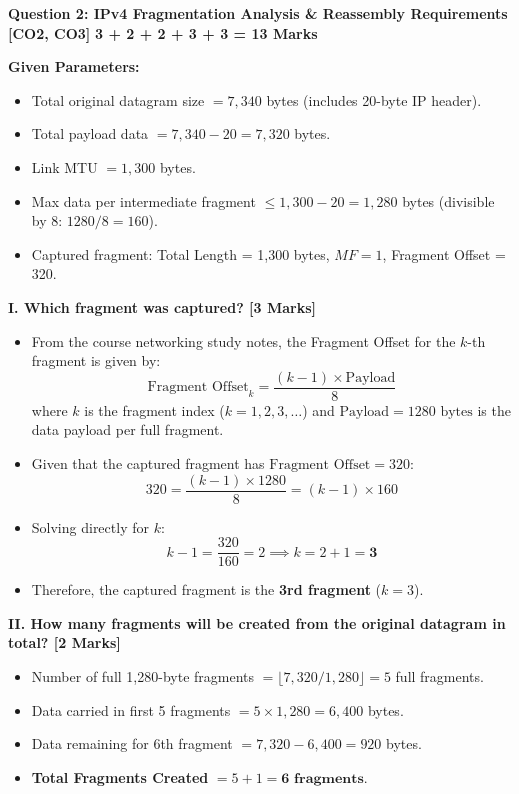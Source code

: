\documentclass[11pt,a4paper]{article}
\newcommand{\questionheader}[3]{
    \vspace{0.35cm}
    \noindent\colorbox{qboxbg}{
        \parbox{\dimexpr\textwidth-2\fboxsep\relax}{
            \textbf{\textcolor{primary}{\large #1}} \hfill \textbf{\textcolor{accent}{[#2]}} \hfill \textbf{\textcolor{secondary}{#3 Marks}}
        }
    }
    \vspace{0.15cm}
}
\begin{document}
\newpage
\questionheader{Question 2: IPv4 Fragmentation Analysis \& Reassembly Requirements}{CO2, CO3}{3 + 2 + 2 + 3 + 3 = 13}

\textbf{Given Parameters:}
\begin{itemize}
    \item Total original datagram size $= 7,340$ bytes (includes 20-byte IP header).
    \item Total payload data $= 7,340 - 20 = 7,320$ bytes.
    \item Link MTU $= 1,300$ bytes.
    \item Max data per intermediate fragment $\le 1,300 - 20 = 1,280$ bytes (divisible by 8: $1280 / 8 = 160$).
    \item Captured fragment: Total Length = 1,300 bytes, $MF = 1$, Fragment Offset = 320.
\end{itemize}

\textbf{I. Which fragment was captured? [3 Marks]}
\begin{itemize}
    \item From the course networking study notes, the Fragment Offset for the $k$-th fragment is given by:
    \[
    \text{Fragment Offset}_k = \frac{(k - 1) \times \text{Payload}}{8}
    \]
    where $k$ is the fragment index ($k = 1, 2, 3, \dots$) and $\text{Payload} = 1280\text{ bytes}$ is the data payload per full fragment.
    \item Given that the captured fragment has $\text{Fragment Offset} = 320$:
    \[
    320 = \frac{(k - 1) \times 1280}{8} = (k - 1) \times 160
    \]
    \item Solving directly for $k$:
    \[
    k - 1 = \frac{320}{160} = 2 \implies k = 2 + 1 = \mathbf{3}
    \]
    \item Therefore, the captured fragment is the \textbf{3rd fragment} ($k = 3$).
\end{itemize}

\textbf{II. How many fragments will be created from the original datagram in total? [2 Marks]}
\begin{itemize}
    \item Number of full 1,280-byte fragments $= \lfloor 7,320 / 1,280 \rfloor = 5$ full fragments.
    \item Data carried in first 5 fragments $= 5 \times 1,280 = 6,400$ bytes.
    \item Data remaining for 6th fragment $= 7,320 - 6,400 = 920$ bytes.
    \item \textbf{Total Fragments Created} $= 5 + 1 = \mathbf{6\text{ fragments}}$.
\end{itemize}
\end{document}
